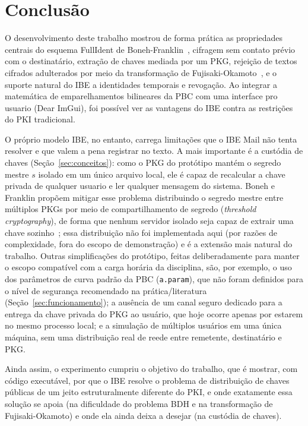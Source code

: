 \chapter{Conclusão}
\label{cap:conclusao}

O desenvolvimento deste trabalho mostrou de forma prática as propriedades centrais do esquema
FullIdent de Boneh-Franklin~\cite{boneh2001ibe}, cifragem sem contato prévio com o destinatário,
extração de chaves mediada por um PKG, rejeição de textos cifrados adulterados por meio da
transformação de Fujisaki-Okamoto~\cite{fujisaki1999secure}, e o suporte natural do IBE a
identidades temporais e revogação. Ao integrar a matemática de emparelhamentos bilineares da
PBC com uma interface pro usuario (Dear ImGui), foi possível ver as vantagens do IBE contra as
restrições do PKI tradicional.

O próprio modelo IBE, no entanto, carrega limitações que o IBE Mail não tenta resolver e que
valem a pena registrar no texto. A mais importante é a custódia de chaves (Seção~\ref{sec:conceitos}):
como o PKG do protótipo mantém o segredo mestre $s$ isolado em um único arquivo local, ele é
capaz de recalcular a chave privada de qualquer usuario e ler qualquer mensagem do sistema.
Boneh e Franklin propõem mitigar esse problema distribuindo o segredo mestre entre
múltiplos PKGs por meio de compartilhamento de segredo (\textit{threshold cryptography}), de
forma que nenhum servidor isolado seja capaz de extrair uma chave sozinho~\cite{boneh2001ibe};
essa distribuição não foi implementada aqui (por razões de complexidade, fora do escopo de demonstração)
e é a extensão mais natural do trabalho. Outras simplificações do protótipo, feitas deliberadamente 
para manter o escopo compatível com a carga horária da disciplina, são, por exemplo, o uso dos parâmetros 
de curva padrão da PBC (\texttt{a.param}), que não foram definidos para o nível de segurança recomendado na
prática/literatura (Seção~\ref{sec:funcionamento}); a ausência de um canal seguro dedicado para a entrega
da chave privada do PKG ao usuário, que hoje ocorre apenas por estarem no mesmo processo local;
e a simulação de múltiplos usuários em uma única máquina, sem uma distribuição real de reede entre
remetente, destinatário e PKG.

Ainda assim, o experimento cumpriu o objetivo do trabalho, que é mostrar, com código executável, por
que o IBE resolve o problema de distribuição de chaves públicas de um jeito estruturalmente
diferente do PKI, e onde exatamente essa solução se apoia (na dificuldade do problema BDH e na
transformação de Fujisaki-Okamoto) e onde ela ainda deixa a desejar (na custódia de chaves).
